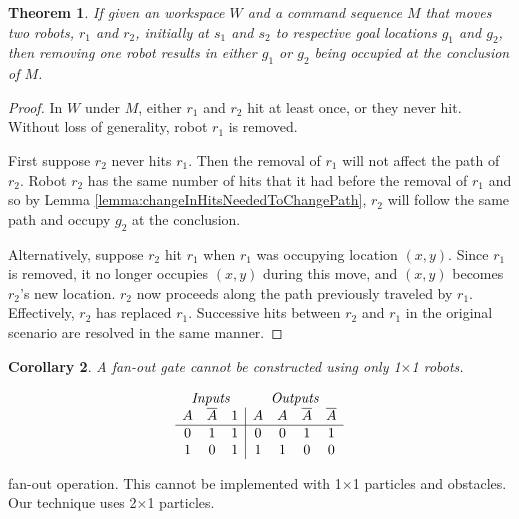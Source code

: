\documentclass[letterpaper, 10 pt, conference]{ieeeconf}
\newtheorem{theorem}{Theorem}
\newtheorem{corollary}[theorem]{Corollary}
\begin{document}
\begin{theorem}\label{thm:TwoRobotsTwoGoalsImpliesOneRobotOneGoal} 
If given an workspace $W$ and a command sequence $M$ that moves two robots, $r_1$ and $r_2$, initially at $s_1$ and $s_2$ to respective goal locations $g_1$ and $g_2$, then removing one robot results in either $g_1$ or $g_2$ being occupied at the conclusion of $M$.
\end{theorem}

\begin{proof} 
In $W$ under $M$, either $r_1$ and $r_2$ hit at least once, or they never hit. Without loss of generality, robot $r_1$ is removed. 

First suppose $r_2$ never hits $r_1$. Then the removal of $r_1$ will not affect the path of $r_2$. Robot $r_2$ has the same number of hits that it had before the removal of $r_1$ and so by Lemma \ref{lemma:changeInHitsNeededToChangePath}, $r_2$ will follow the same path and occupy $g_2$ at the conclusion. 

Alternatively, suppose $r_2$ hit $r_1$ when $r_1$ was occupying location $(x,y)$. Since $r_1$ is removed, it no longer occupies $(x,y)$ during this move, and $(x,y)$ becomes $r_2$'s new location. $r_2$ now proceeds along the path previously traveled by $r_1$. Effectively, $r_2$ has replaced $r_1$.  Successive hits between $r_2$ and $r_1$ in the original scenario are resolved in the same manner.
\end{proof}

\begin{corollary}\label{cor:No1x1FanOut}
A  {\sc fan-out} gate cannot be constructed using only 1$\times$1 robots.
\end{corollary}

  \begin{table}
\begin{displaymath}
\begin{array}{ccc|cccc}
\multicolumn{3}{c}{\emph{Inputs}} & \multicolumn{4}{c}{\emph{Outputs}} \\
   A & \overline{A} & 1 & A & A &  \overline{A} & \overline{A}\\
\hline
0 & 1 & 1 & 0 & 0 & 1 & 1  \\
1 & 0 & 1 & 1 & 1 & 0 & 0  \\
\end{array}
\end{displaymath}
\caption{{\sc fan-out} operation. This cannot be implemented with 1$\times$1 particles and obstacles.   Our technique uses 2$\times$1 particles. }
  \label{tab:Fanout}
\end{table}
\end{document}
